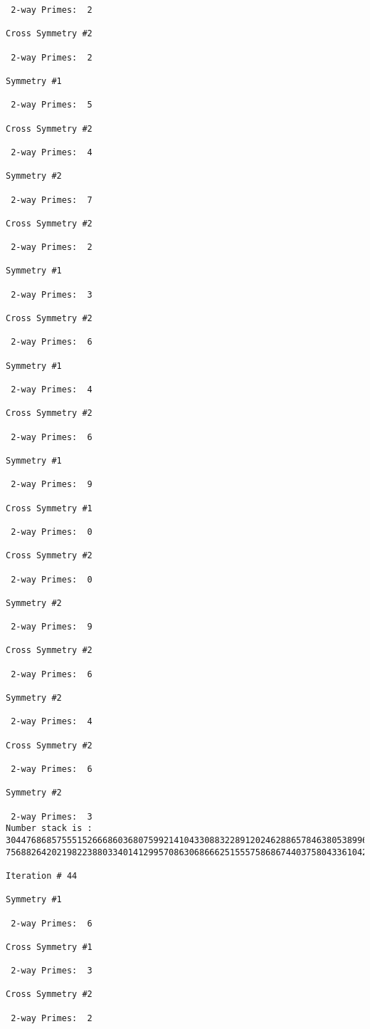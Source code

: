 \begin{verbatim}
 2-way Primes: 	2

Cross Symmetry #2

 2-way Primes: 	2

Symmetry #1

 2-way Primes: 	5

Cross Symmetry #2

 2-way Primes: 	4

Symmetry #2

 2-way Primes: 	7

Cross Symmetry #2

 2-way Primes: 	2

Symmetry #1

 2-way Primes: 	3

Cross Symmetry #2

 2-way Primes: 	6

Symmetry #1

 2-way Primes: 	4

Cross Symmetry #2

 2-way Primes: 	6

Symmetry #1

 2-way Primes: 	9

Cross Symmetry #1

 2-way Primes: 	0

Cross Symmetry #2

 2-way Primes: 	0

Symmetry #2

 2-way Primes: 	9

Cross Symmetry #2

 2-way Primes: 	6

Symmetry #2

 2-way Primes: 	4

Cross Symmetry #2

 2-way Primes: 	6

Symmetry #2

 2-way Primes: 	3
Number stack is :
30447686857555152666860368075992141043308832289120246288657846380538996794608835958544046240163340857
75688264202198223880334014129957086306866625155575868674403758043361042640445859538806497699835083648

Iteration #	44

Symmetry #1

 2-way Primes: 	6

Cross Symmetry #1

 2-way Primes: 	3

Cross Symmetry #2

 2-way Primes: 	2


\end{verbatim}
